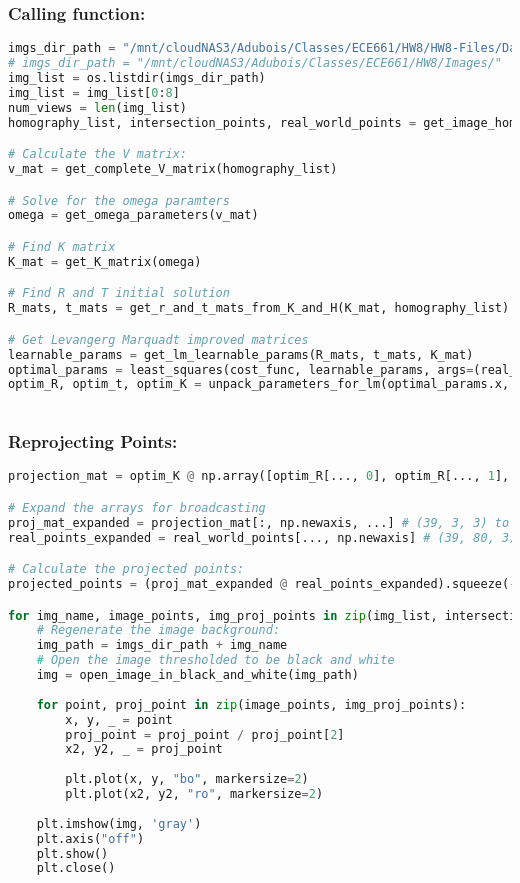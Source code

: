 \documentclass{article}
\begin{document}
\subsubsection*{Calling function:}
\begin{lstlisting}[language=Python]
imgs_dir_path = "/mnt/cloudNAS3/Adubois/Classes/ECE661/HW8/HW8-Files/Dataset1/"
# imgs_dir_path = "/mnt/cloudNAS3/Adubois/Classes/ECE661/HW8/Images/"
img_list = os.listdir(imgs_dir_path)
img_list = img_list[0:8]
num_views = len(img_list)
homography_list, intersection_points, real_world_points = get_image_homography(img_list, real_world_scaling=2.5)

# Calculate the V matrix:
v_mat = get_complete_V_matrix(homography_list)

# Solve for the omega paramters
omega = get_omega_parameters(v_mat)

# Find K matrix
K_mat = get_K_matrix(omega)

# Find R and T initial solution
R_mats, t_mats = get_r_and_t_mats_from_K_and_H(K_mat, homography_list)

# Get Levangerg Marquadt improved matrices
learnable_params = get_lm_learnable_params(R_mats, t_mats, K_mat)
optimal_params = least_squares(cost_func, learnable_params, args=(real_world_points, intersection_points, num_views), method='lm', verbose=2)
optim_R, optim_t, optim_K = unpack_parameters_for_lm(optimal_params.x, num_views)
    
\end{lstlisting}

\subsubsection*{Reprojecting Points:}
\begin{lstlisting}[language=Python]
projection_mat = optim_K @ np.array([optim_R[..., 0], optim_R[..., 1], optim_t]).transpose(1, 0, 2)

# Expand the arrays for broadcasting
proj_mat_expanded = projection_mat[:, np.newaxis, ...] # (39, 3, 3) to (39, 1, 3, 3)
real_points_expanded = real_world_points[..., np.newaxis] # (39, 80, 3) to (39, 80, 3, 1)

# Calculate the projected points:
projected_points = (proj_mat_expanded @ real_points_expanded).squeeze(-1)

for img_name, image_points, img_proj_points in zip(img_list, intersection_points, projected_points):
    # Regenerate the image background:
    img_path = imgs_dir_path + img_name
    # Open the image thresholded to be black and white
    img = open_image_in_black_and_white(img_path)
    
    for point, proj_point in zip(image_points, img_proj_points):
        x, y, _ = point
        proj_point = proj_point / proj_point[2]
        x2, y2, _ = proj_point
        
        plt.plot(x, y, "bo", markersize=2)
        plt.plot(x2, y2, "ro", markersize=2)
    
    plt.imshow(img, 'gray')
    plt.axis("off")
    plt.show()
    plt.close()
\end{lstlisting}
\end{document}
